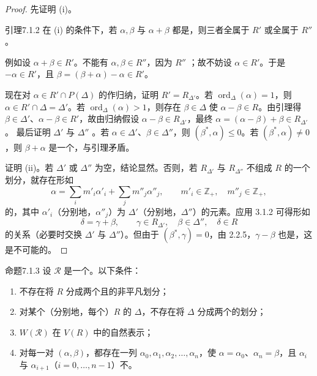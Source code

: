 \begin{proof}
先证明 (i)。
\begin{SGAresult}{引理}{7.1.2}
在 (i) 的条件下，若 $\alpha,\beta$ 与 $\alpha+\beta$ 都是，则三者全属于 $R'$ 或全属于 $R''$。
\end{SGAresult}
例如设 $\alpha+\beta\in R'$。不能有 $\alpha,\beta\in R''$，因为 $R''$ ；故不妨设 $\alpha\in R'$。于是 $-\alpha\in R'$，且 $\beta=(\beta+\alpha)-\alpha\in R'$。

现在对 $\alpha\in R'\cap P(\Delta)$ 的作归纳，证明 $R'=R_{\Delta'}$。若 $\operatorname{ord}_\Delta(\alpha)=1$，则 $\alpha\in R'\cap\Delta=\Delta'$。若 $\operatorname{ord}_\Delta(\alpha)>1$，则存在 $\beta\in\Delta$ 使 $\alpha-\beta\in R$。由引理得 $\beta\in\Delta'$、$\alpha-\beta\in R'$，故由归纳假设 $\alpha-\beta\in R_{\Delta'}$，最终 $\alpha=(\alpha-\beta)+\beta\in R_{\Delta'}$。
最后证明 $\Delta'$ 与 $\Delta''$ 。若 $\alpha\in\Delta'$、$\beta\in\Delta''$，则 $(\beta^*,\alpha)\leq0$。若 $(\beta^*,\alpha)\ne0$，则 $\beta+\alpha$ 是一个，与引理矛盾。

证明 (ii)。若 $\Delta'$ 或 $\Delta''$ 为空，结论显然。否则，若 $R_{\Delta'}$ 与 $R_{\Delta''}$ 不组成 $R$ 的一个划分，就存在形如
\[\alpha=\sum_i m'_i\alpha'_i+\sum_j m''_j\alpha''_j,\qquad m'_i\in\mathbb Z_+,\quad m''_j\in\mathbb Z_+,\]
的，其中 $\alpha'_i$（分别地，$\alpha''_j$）为 $\Delta'$（分别地，$\Delta''$）的元素。应用 3.1.2 可得形如
\[\delta=\gamma+\beta,\qquad\gamma\in R_{\Delta'},\quad\beta\in\Delta'',\quad\delta\in R\]
的关系（必要时交换 $\Delta'$ 与 $\Delta''$）。但由于 $(\beta^*,\gamma)=0$，由 2.2.5，$\gamma-\beta$ 也是，这是不可能的。
\end{proof}
\begin{SGAresult}{命题}{7.1.3}
设 $\mathscr R$ 是一个。以下条件：
\begin{enumerate}
\item[(i)] 不存在将 $R$ 分成两个且的非平凡划分；
\item[(ii)] 对某个（分别地，每个）$R$ 的 $\Delta$，不存在将 $\Delta$ 分成两个的划分；
\item[(iii)] $W(\mathscr R)$ 在 $V(R)$ 中的自然表示；
\item[(iv)] 对每一对 $(\alpha,\beta)$，都存在一列 $\alpha_0,\alpha_1,\alpha_2,\ldots,\alpha_n$，使 $\alpha=\alpha_0$、$\alpha_n=\beta$，且 $\alpha_i$ 与 $\alpha_{i+1}$（$i=0,\ldots,n-1$）不。
\end{enumerate}
\end{SGAresult}
